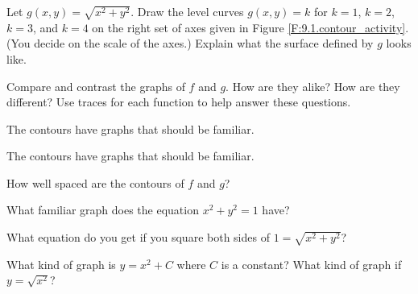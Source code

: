 \begin{activity}
    \item Let $g(x,y) = \sqrt{x^2+y^2}$. Draw the level curves $g(x,y) = k$ for $k=1$, $k=2$, $k=3$, and $k=4$ on the right set of axes given in Figure \ref{F:9.1.contour_activity}. (You decide on the scale of the axes.) Explain what the surface defined by $g$ looks like.

    \item Compare and contrast the graphs of $f$ and $g$. How are they alike? How are they different? Use traces for each function to help answer these questions.

     \ea

\end{activity}
\begin{smallhint}
\ba
\item The contours have graphs that should be familiar. 
\item The contours have graphs that should be familiar.
\item How well spaced are the contours of $f$ and $g$?  
\ea
\end{smallhint}
\begin{bighint}
\ba
\item What familiar graph does the equation $x^2+y^2=1$ have?
\item What equation do you get if you square both sides of $1 = \sqrt{x^2+y^2}$?
\item What kind of graph is $y=x^2+C$ where $C$ is a constant? What kind of graph if $y = \sqrt{x^2}$? 
\ea
\end{bighint}

